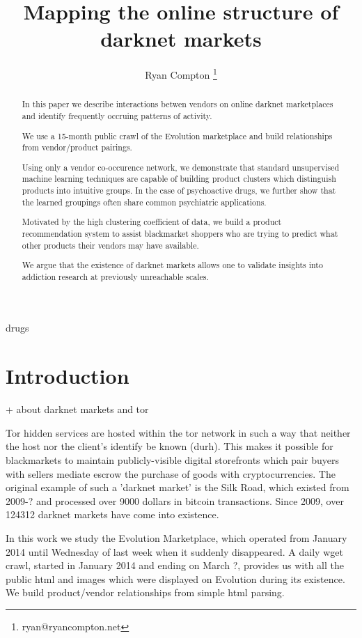 \documentclass[11pt]{article}
\title{Mapping the online structure of darknet markets}
\author{Ryan Compton \thanks{ryan@ryancompton.net}}
\begin{document}
\maketitle

\begin{abstract}

In this paper we describe interactions betwen vendors on online darknet marketplaces and identify frequently occruing patterns of activity.

We use a 15-month public crawl of the Evolution marketplace and build relationships from vendor/product pairings.

Using only a vendor co-occurence network, we demonstrate that standard unsupervised machine learning techniques are capable of building product clusters which distinguish products into intuitive groups. In the case of psychoactive drugs, we further show that the learned groupings often share common psychiatric applications.

Motivated by the high clustering coefficient of data, we build a product recommendation system to assist blackmarket shoppers who are trying to predict what other products their vendors may have available.

We argue that the existence of darknet markets allows one to validate insights into addiction research at previously unreachable scales.

\end{abstract}

\begin{keywords}
drugs
\end{keywords}

\section{Introduction}
\label{sec:intro}


+ about darknet markets and tor

Tor hidden services are hosted within the tor network in such a way that neither the host nor the client's identify be known (durh). This makes it possible for blackmarkets to maintain publicly-visible digital storefronts which pair buyers with sellers mediate escrow the purchase of goods with cryptocurrencies. The original example of such a 'darknet market' is the Silk Road, which existed from 2009-? and processed over 9000 dollars in bitcoin transactions. Since 2009, over 124312 darknet markets have come into existence.

In this work we study the Evolution Marketplace, which operated from January 2014 until Wednesday of last week when it suddenly disappeared. A daily wget crawl, started in January 2014 and ending on March ?, provides us with all the public html and images which were displayed on Evolution during its existence. We build product/vendor relationships from simple html parsing.
\end{document}
